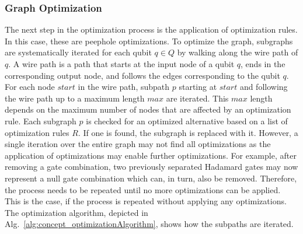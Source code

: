 \subsubsection{Graph Optimization}
The next step in the optimization process is the application of optimization rules. In this case, these are peephole optimizations. To optimize the graph, subgraphs are systematically iterated for each qubit $q \in Q$ by walking along the wire path of $q$. 
A wire path is a path that starts at the input node of a qubit $q$, ends in the corresponding output node, and follows the edges corresponding to the qubit $q$. 
For each node $start$ in the wire path, subpath $p$ starting at $start$ and following the wire path up to a maximum length $max$ are iterated.
This $max$ length depends on the maximum number of nodes that are affected by an optimization rule.
Each subgraph $p$ is checked for an optimized alternative based on a list of optimization rules $R$. If one is found, the subgraph is replaced with it. 
However, a single iteration over the entire graph may not find all optimizations as the application of optimizations may enable further optimizations. 
For example, after removing a gate combination, two previously separated Hadamard gates may now represent a null gate combination which can, in turn, also be removed. 
Therefore, the process needs to be repeated until no more optimizations can be applied. This is the case, if the process is repeated without applying any optimizations.
The optimization algorithm, depicted in Alg.~\ref{alg:concept_optimizationAlgorithm}, shows how the subpaths are iterated.

